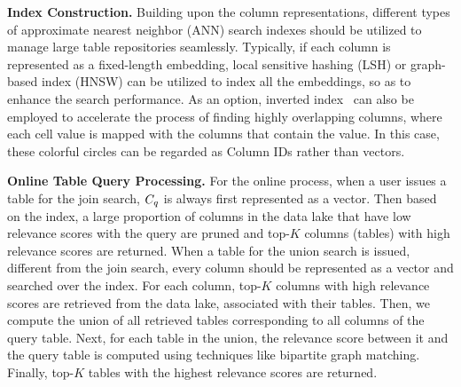 
\noindent\textbf{Index Construction.} Building upon the  column representations, different types of approximate nearest neighbor (ANN) search indexes should be utilized to manage large table repositories seamlessly. Typically, if each column is represented as a fixed-length embedding, local sensitive hashing (LSH) or graph-based index (HNSW) can be utilized to index all the embeddings, so as to enhance the search performance.
 As an option, inverted index~\cite{} can also be employed  to  accelerate the process of finding highly overlapping columns, where each cell value is mapped with the columns that contain the value. In this case, these colorful circles can be regarded as  Column IDs rather than vectors.





\noindent\textbf{Online Table Query Processing.} For the online process, when a user issues a table for the join search, $C_q$ is always first represented as a vector. Then based on the index, a large proportion of columns in the data lake that have low relevance scores with the query are pruned and top-$K$ columns (tables) with high relevance scores are returned. When a table for the union search is issued, different from the join search, every column should be represented as a vector and searched over the index. For each column, top-$K$ columns with high relevance scores are retrieved from the data lake, associated with their tables. Then, we compute the union of all retrieved tables corresponding to all columns of the query table. Next, for each table in the union, the relevance score between it and the query table is computed using techniques like bipartite graph matching. Finally, top-$K$ tables with the highest relevance scores are returned.





